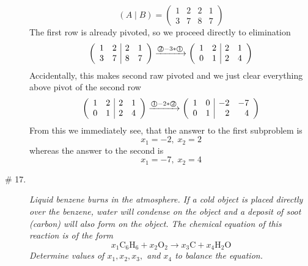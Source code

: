 \documentclass[8pt]{article} %
\newcommand{\myexplain}[3]{#1\xrightarrow{\text{#2}}#3}
\begin{document}
\begin{description}
{	\[\left(A\mid B\right)=\left(\begin{array}{rr|rr}1&2&2&1\\3&7&8&7\end{array}\right)\]
	The first row is already pivoted, so we proceed directly to elimination
	\[\myexplain
	{\left(\begin{array}{rr|rr}1&2&2&1\\3&7&8&7\end{array}\right)}
	{\textcircled{2}$-3*$\textcircled{1}}
	{\left(\begin{array}{rr|rr}1&2&2&1\\0&1&2&4\end{array}\right)}
	\]
	Accidentally, this makes second raw pivoted and we just clear everything above pivot of the second row
	\[\myexplain
	{\left(\begin{array}{rr|rr}1&2&2&1\\0&1&2&4\end{array}\right)}
	{\textcircled{1}$-2*$\textcircled{2}}
	{\left(\begin{array}{rr|rr}1&0&-2&-7\\0&1&2&4\end{array}\right)}
	\]
	From this we immediately see, that the answer to the first subproblem is
	\[x_1=-2,\;x_2=2\]
	whereas the answer to the second is
	\[x_1=-7,\;x_2=4\]
	}
\item[\# 17.]{{\it Liquid benzene burns in the atmosphere. If a cold object is placed directly over the benzene, water will condense on
	the object and a deposit of soot (carbon) will also form on the object. The chemical equation of this reaction is of the form}
	\[x_1\mbox{C}_6\mbox{H}_6+x_2\mbox{O}_2\to x_3\mbox{C}+x_4\mbox{H}_2\mbox{O}\]
	{\it Determine values of $x_1,x_2,x_3,$ and $x_4$ to balance the equation.}}
\end{description}
\end{document}
